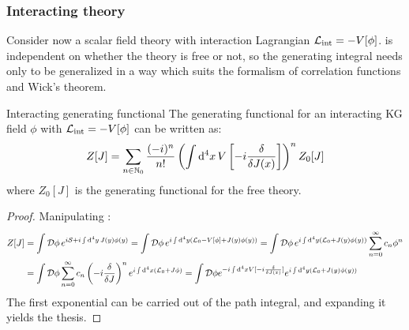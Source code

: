 \subsubsection{Interacting theory}

Consider now a scalar field theory with interaction Lagrangian $ \mathcal{L}_\text{int} = - V[\phi] $.  is independent on whether the theory is free or not, so the generating integral needs only to be generalized in a way which suits the formalism of correlation functions and Wick's theorem.

\begin{proposition}{Interacting generating functional}{}
  The generating functional for an interacting KG field $ \phi $ with $ \mathcal{L}_\text{int} = - V[\phi] $ can be written as:
  \begin{equation}
    Z[J] = \sum_{n \in \mathbb{N}_0} \frac{(-i)^n}{n!} \left( \int \mathrm{d}^4x\, V \left[ -i \frac{\delta}{\delta J(x)} \right] \right)^n Z_0[J]
    \label{eq:z-int}
  \end{equation}
  where $ Z_0[J] $ is the generating functional for the free theory.
\end{proposition}

\begin{proofbox}
  \begin{proof}
    Manipulating :
    \begin{equation*}
      \begin{split}
        Z[J]
        & = \int \mathcal{D}\phi\, e^{i\mathcal{S} + i \int \mathrm{d}^4y\, J(y) \phi(y)} = \int \mathcal{D}\phi\, e^{i \int \mathrm{d}^4y \left( \mathcal{L}_0 - V[\phi] + J(y) \phi(y) \right)} = \int \mathcal{D}\phi\, e^{i \int \mathrm{d}^4y \left( \mathcal{L}_0 + J(y) \phi(y) \right)} \sum_{n = 0}^\infty c_n \phi^n \\
        & = \int \mathcal{D}\phi \sum_{n = 0}^\infty c_n \left( -i \frac{\delta}{\delta J} \right)^n e^{i \int \mathrm{d}^4x \left( \mathcal{L}_0 + J \phi \right)} = \int \mathcal{D} \phi e^{-i \int \mathrm{d}^4x V[-i \frac{\delta}{\delta J(x)}]} e^{i \int \mathrm{d}^4y \left( \mathcal{L}_0 + J(y) \phi(y) \right)}
      \end{split}
    \end{equation*}
    The first exponential can be carried out of the path integral, and expanding it yields the thesis.
  \end{proof}
\end{proofbox}

